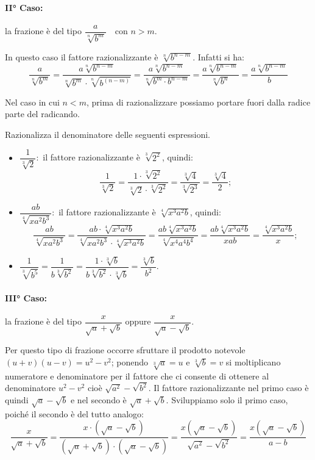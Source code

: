 \paragraph{II° Caso:} la frazione è del tipo $\dfrac a{\sqrt[n]{b^m}}$~~con $n>m$.

In questo caso il fattore razionalizzante è $\sqrt[n]{b^{n-m}}$. Infatti si ha:
\begin{equation*}
\dfrac a{\sqrt[n]{b^m}}=\dfrac{a\sqrt[n]{b^{n-m}}}{\sqrt[n]{b^m}\cdot \sqrt[n]{b^{(n-m)}}}=\dfrac{a\sqrt[n]{b^{n-m}}}{\sqrt[n]{b^m\cdot b^{n-m}}}=\dfrac{a\sqrt[n]{b^{n-m}}}{\sqrt[n]{b^n}}=\dfrac{a\sqrt[n]{b^{n-m}}} b
\end{equation*}

Nel caso in cui $n<m$, prima di razionalizzare possiamo portare fuori dalla radice parte del radicando.

\begin{exrig}
 \begin{esempio}
Razionalizza il denominatore delle seguenti espressioni.
\begin{itemize}
 \item $\dfrac 1{\sqrt[3]2}$:\, il fattore razionalizzante è $\sqrt[3]{2^2}$, quindi:\[\dfrac 1{\sqrt[3]2}=\dfrac{1\cdot \sqrt[3]{2^2}}{\sqrt[3]2\cdot \sqrt[3]{2^2}}=\dfrac{\sqrt[3]4}{\sqrt[3]{2^3}}=\dfrac{\sqrt[3]4} 2;\]
 \item $\dfrac{ab}{\sqrt[4]{xa^2b^3}}$:\, il fattore razionalizzante è $\sqrt[4]{x^3a^2b}$, quindi: \[\dfrac{ab}{\sqrt[4]{xa^2b^3}}=\dfrac{ab\cdot \sqrt[4]{x^3a^2b}}{\sqrt[4]{xa^2b^3}\cdot \sqrt[4]{x^3a^2b}}=\dfrac{ab\sqrt[4]{x^3a^2b}}{\sqrt[4]{x^4a^4b^4}}=\dfrac{ab\sqrt[4]{x^3a^2b}}{xab}=\dfrac{\sqrt[4]{x^3a^2b}} x;\]
 \item $\dfrac 1{\sqrt[3]{b^5}}=\dfrac 1{b\sqrt[3]{b^2}}=\dfrac{1\cdot \sqrt[3]b}{b\sqrt[3]{b^2}\cdot \sqrt[3]b}=\dfrac{\sqrt[3]b}{b^2}$.
\end{itemize}
 \end{esempio}
\end{exrig}


\paragraph{III° Caso:} la frazione è del tipo $\dfrac x{\sqrt a+\sqrt b}$ oppure $\dfrac x{\sqrt a-\sqrt b}$.

Per questo tipo di frazione occorre sfruttare il prodotto notevole $(u+v)(u-v)=u^2-v^2$; ponendo $\sqrt[3]a = u$ e $\sqrt[3]b = v$ si moltiplicano numeratore e denominatore per il fattore che ci consente di ottenere al denominatore $u^2-v^2$ cioè $\sqrt{a^2}-\sqrt{b^2}$. Il fattore razionalizzante nel primo caso è quindi $\sqrt a-\sqrt b$ e nel secondo è $\sqrt a+\sqrt b$.
Sviluppiamo solo il primo caso, poiché il secondo è del tutto analogo:
\begin{equation*}
\dfrac x{\sqrt a+\sqrt b}=\dfrac{x\cdot (\sqrt a-\sqrt b)}{(\sqrt a+\sqrt b)\cdot (\sqrt a-\sqrt b)}=\dfrac{x(\sqrt a-\sqrt b)}{\sqrt{a^2}-\sqrt{b^2}}=\dfrac{x(\sqrt a-\sqrt b)}{a-b}
\end{equation*}

